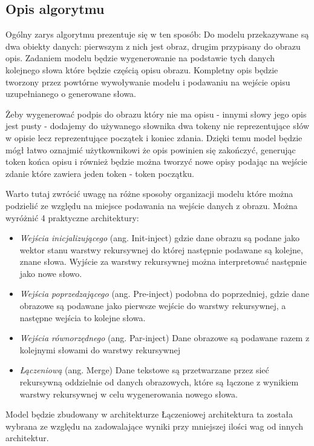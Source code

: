 \subsection{Opis algorytmu}
Ogólny zarys algorytmu prezentuje się w ten sposób: Do modelu przekazywane są dwa obiekty danych: pierwszym z nich jest obraz, drugim przypisany do obrazu opis. Zadaniem modelu będzie wygenerowanie na podstawie tych danych kolejnego słowa które będzie częścią opisu obrazu. Kompletny opis będzie tworzony przez powtórne wywoływanie modelu i podawaniu na wejście opisu uzupełnianego o generowane słowa. 

Żeby wygenerować podpis do obrazu który nie ma opisu - innymi słowy jego opis jest pusty - dodajemy do używanego słownika dwa tokeny nie reprezentujące słów w opisie lecz reprezentujące początek i koniec zdania. Dzięki temu model będzie mógł łatwo oznajmić użytkownikowi że opis powinien się zakończyć, generując token końca opisu i również będzie można tworzyć nowe opisy podając na wejście zdanie które zawiera jeden token - token początku.

Warto tutaj zwrócić uwagę na różne sposoby organizacji modelu które można podzielić ze względu na miejsce podawania na wejście danych z obrazu. Można wyróżnić 4 praktyczne architektury: \cite{rnn-in-captiongen}
\begin{itemize}
	\item \textit{Wejścia inicjalizującego} (ang. Init-inject) gdzie dane obrazu są podane jako wektor stanu warstwy rekursywnej do której następnie podawane są kolejne, znane słowa. Wyjście za warstwy rekursywnej można interpretować następnie jako nowe słowo. 
	\item \textit{Wejścia poprzedzającego} (ang. Pre-inject) podobna do poprzedniej, gdzie dane obrazowe są podawane jako pierwsze wejście do warstwy rekursywnej, a następne wejścia to kolejne słowa.
	\item \textit{Wejścia równorzędnego} (ang. Par-inject) Dane obrazowe są podawane razem z kolejnymi słowami do warstwy rekursywnej
	\item \textit{Łączeniową} (ang. Merge) Dane tekstowe są przetwarzane przez sieć rekursywną oddzielnie od danych obrazowych, które są łączone z wynikiem warstwy rekursywnej w celu wygenerowania nowego słowa.
\end{itemize}


Model będzie zbudowany w architekturze Łączeniowej architektura ta została wybrana ze względu na zadowalające wyniki przy mniejszej ilości wag od innych architektur.\cite[p.~25]{rnn-in-captiongen}
